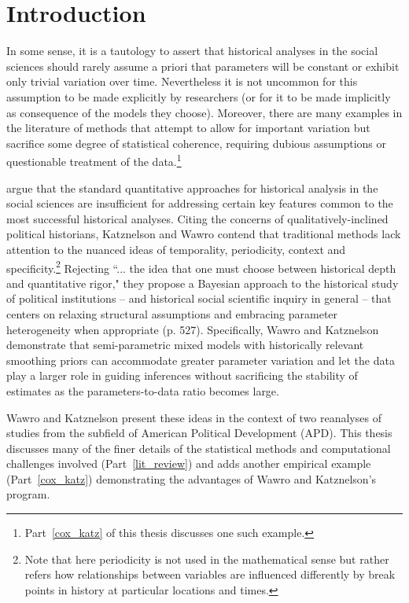 \chapter{Introduction}
\label{introduction}

In some sense, it is a tautology to assert that historical analyses in the social sciences should rarely assume a priori that parameters will be constant or exhibit only trivial variation over time. Nevertheless it is not uncommon for this assumption to be made explicitly by researchers (or for it to be made implicitly as consequence of the models they choose). Moreover, there are many examples in the literature of methods that attempt to allow for important variation but sacrifice some degree of statistical coherence, requiring dubious assumptions or questionable treatment of the data.\footnote{Part~\ref{cox_katz} of this thesis discusses one such example.}  

 argue that the standard quantitative approaches for historical analysis in the social sciences are insufficient for addressing certain key features common to the most successful historical analyses. Citing the concerns of qualitatively-inclined political historians, Katznelson and Wawro contend that traditional methods lack attention to the nuanced ideas of temporality, periodicity, context and specificity.\footnote{Note that here periodicity is not used in the mathematical sense but rather refers how relationships between variables are influenced differently by break points in history at particular locations and times.}  Rejecting ``... the idea that one must choose between historical depth and quantitative rigor," they propose a Bayesian approach to the historical study of political institutions -- and historical social scientific inquiry in general --  that centers on relaxing structural assumptions and embracing  parameter heterogeneity when appropriate (p. 527). Specifically, Wawro and Katznelson demonstrate that semi-parametric mixed models with historically relevant smoothing priors can accommodate greater parameter variation and let the data play a larger role in guiding inferences without sacrificing the stability of estimates as the parameters-to-data ratio becomes large.  

Wawro and Katznelson present these ideas in the context of two reanalyses of studies from the subfield of American Political Development (APD). This thesis discusses many of the finer details of the statistical methods and computational challenges involved (Part~\ref{lit_review}) and adds another empirical example (Part~\ref{cox_katz}) demonstrating the advantages of Wawro and Katznelson's program. 


